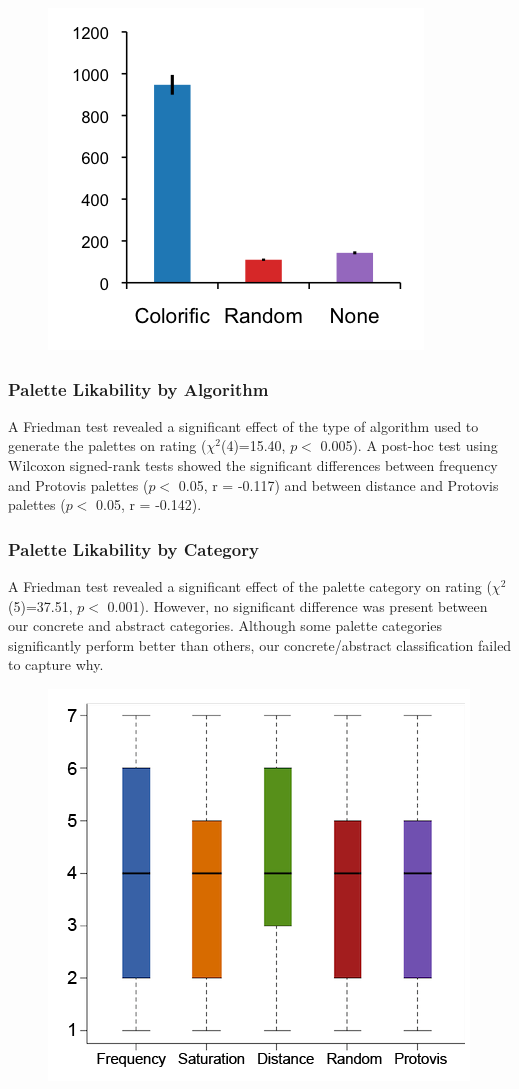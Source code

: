 \begin{figure}
\label{relevance}
\includegraphics{relevance_chart.png}
\caption{}
\end{figure}

\subsubsection{Palette Likability by Algorithm} 
A Friedman test revealed a significant effect of the type of algorithm used to generate the palettes on rating ($\chi^2$(4)=15.40, $p <$ 0.005). A post-hoc test using Wilcoxon signed-rank tests showed the significant differences between frequency and Protovis palettes ($p <$ 0.05, r = -0.117) and between distance and Protovis palettes ($p <$ 0.05, r = -0.142).

\subsubsection{Palette Likability by Category}
A Friedman test revealed a significant effect of the palette category on rating ($\chi^2$(5)=37.51, $p <$ 0.001). However, no significant difference was present between our concrete and abstract categories. Although some palette categories significantly perform better than others, our concrete/abstract classification failed to capture why.

\begin{figure}
\label{likability}
\includegraphics{likability_algorithm.png}
\caption{}
\end{figure}